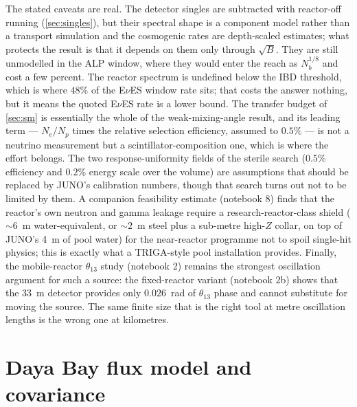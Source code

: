\documentclass[aps,prd,superscriptaddress,nofootinbib,longbibliography,notitlepage,11pt]{revtex4-2}
\newcommand{\eves}{E$\nu$ES}
\begin{document}
The stated caveats are real.  The detector singles are subtracted with reactor-off
running (\cref{sec:singles}), but their spectral shape is a component model
rather than a transport simulation and the cosmogenic rates are depth-scaled estimates;
what protects the result is that it depends on them only through $\sqrt{B}$.  They are
still unmodelled in the ALP window, where they would enter the reach as $N_b^{1/8}$ and
cost a few percent.  The reactor spectrum is undefined below the IBD threshold, which is
where $48\%$ of the \eves{} window rate sits; that costs the answer nothing, but it means
the quoted \eves{} rate is a lower bound.  The transfer budget of \cref{sec:sm} is
essentially the whole of the weak-mixing-angle result, and its leading term ---
$N_e/N_p$ times the relative selection efficiency, assumed to $0.5\%$ --- is not a neutrino
measurement but a scintillator-composition one, which is where the effort belongs.  The two
response-uniformity fields of the sterile search ($0.5\%$ efficiency and $0.2\%$ energy
scale over the volume) are assumptions that should be replaced by JUNO's calibration
numbers, though that search turns out not to be limited by them.  A companion feasibility estimate (notebook 8)
finds that the reactor's own neutron and gamma leakage require a research-reactor-class
shield ($\sim6$~m water-equivalent, or $\sim2$~m steel plus a sub-metre high-$Z$ collar, on
top of JUNO's 4~m of pool water) for the near-reactor programme not to spoil single-hit
physics; this is exactly what a TRIGA-style pool installation provides.  Finally, the
mobile-reactor $\theta_{13}$ study (notebook 2) remains the strongest oscillation argument
for such a source: the fixed-reactor variant (notebook 2b) shows that the 33~m detector
provides only $0.026$~rad of $\theta_{13}$ phase and cannot substitute for moving the source.
The same finite size that is the right tool at metre oscillation lengths is the wrong one at
kilometres.

\appendix

\section{Daya Bay flux model and covariance}
\label{app:flux}
\end{document}
